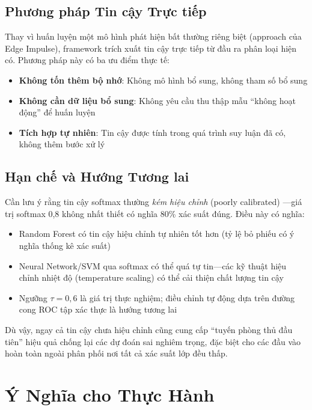 \subsection{Phương pháp Tin cậy Trực tiếp}
Thay vì huấn luyện một mô hình phát hiện bất thường riêng biệt (approach của Edge Impulse), framework trích xuất tin cậy trực tiếp từ đầu ra phân loại hiện có. Phương pháp này có ba ưu điểm thực tế:
\begin{itemize}
    \item \textbf{Không tốn thêm bộ nhớ}: Không mô hình bổ sung, không tham số bổ sung
    \item \textbf{Không cần dữ liệu bổ sung}: Không yêu cầu thu thập mẫu ``không hoạt động'' để huấn luyện
    \item \textbf{Tích hợp tự nhiên}: Tin cậy được tính trong quá trình suy luận đã có, không thêm bước xử lý
\end{itemize}

\subsection{Hạn chế và Hướng Tương lai}
Cần lưu ý rằng tin cậy softmax thường \textit{kém hiệu chỉnh} (poorly calibrated) \cite{guo2017calibration}---giá trị softmax 0,8 không nhất thiết có nghĩa 80\% xác suất đúng. Điều này có nghĩa:
\begin{itemize}
    \item Random Forest có tin cậy hiệu chỉnh tự nhiên tốt hơn (tỷ lệ bỏ phiếu có ý nghĩa thống kê xác suất)
    \item Neural Network/SVM qua softmax có thể quá tự tin---các kỹ thuật hiệu chỉnh nhiệt độ (temperature scaling) \cite{guo2017calibration} có thể cải thiện chất lượng tin cậy
    \item Ngưỡng $\tau = 0{,}6$ là giá trị thực nghiệm; điều chỉnh tự động dựa trên đường cong ROC tập xác thực là hướng tương lai
\end{itemize}

Dù vậy, ngay cả tin cậy chưa hiệu chỉnh cũng cung cấp ``tuyến phòng thủ đầu tiên'' hiệu quả chống lại các dự đoán sai nghiêm trọng, đặc biệt cho các đầu vào hoàn toàn ngoài phân phối nơi tất cả xác suất lớp đều thấp.

\section{Ý Nghĩa cho Thực Hành}


